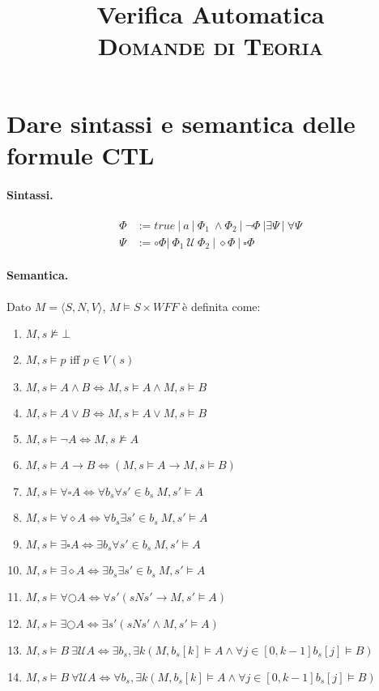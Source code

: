 \documentclass[a4paper,11pt]{article}
\title{\LARGE\textbf{Verifica Automatica \\\large\scshape Domande di Teoria}}
\date{}
\newcommand{\until}{\mathcal{U}}
\begin{document}
	\maketitle
	\section{Dare sintassi e semantica delle formule CTL}
	\paragraph{Sintassi.}
	\begin{align*}
		\Phi &:= true\ \vert\ a\ \vert\ \Phi_1\ \wedge\Phi_2\ \vert\ \neg\Phi\ \vert\exists\Psi\ \vert\ \forall\Psi \\
		\Psi &:=\circ\Phi\vert\ \Phi_1\ \until\ \Phi_2\ \vert\ \diamond\Phi\ \vert\ \square\Phi
	\end{align*}

	\paragraph{Semantica.} Dato $M=\langle S,N,V \rangle$, $M \models S \times WFF$ è definita come:
	\begin{enumerate}
		\item $M, s \not\models \bot$
		\item $M, s \models p$ iff $p \in V(s)$
		\item $M, s \models A \wedge B \iff M, s \models A \wedge M, s \models B$
		\item $M, s \models A \vee B \iff M, s \models A \vee M, s \models B$
		\item $M,s \models \neg A \iff M, s \not\models A$
		\item $M, s \models A \rightarrow B \iff (M, s \models A \rightarrow M, s \models B)$
		\item $M, s \models \forall \square A \iff \forall b_s \forall s' \in b_s\ M, s' \models A$
		\item $M, s \models \forall \diamond A \iff \forall b_s \exists s' \in b_s\ M, s' \models A$
		\item $M, s \models \exists \square A \iff \exists b_s \forall s' \in b_s\ M, s' \models A$
		\item $M, s \models \exists \diamond A \iff \exists b_s \exists s' \in b_s\ M, s' \models A$
		\item $M, s \models \forall \bigcirc A \iff \forall s' (sNs' \rightarrow M, s' \models A)$
		\item $M, s \models \exists \bigcirc A \iff \exists s' (sNs' \wedge M, s' \models A)$
		\item $M, s \models B\ \exists \until A \iff \exists b_s, \exists k (M, b_s[k] \models A \wedge \forall j \in [0, k-1] b_s[j] \models B)$
		\item $M, s \models B\ \forall \until A \iff \forall b_s, \exists k (M, b_s[k] \models A \wedge \forall j \in [0, k-1] b_s[j] \models B)$
	\end{enumerate}
\end{document}
